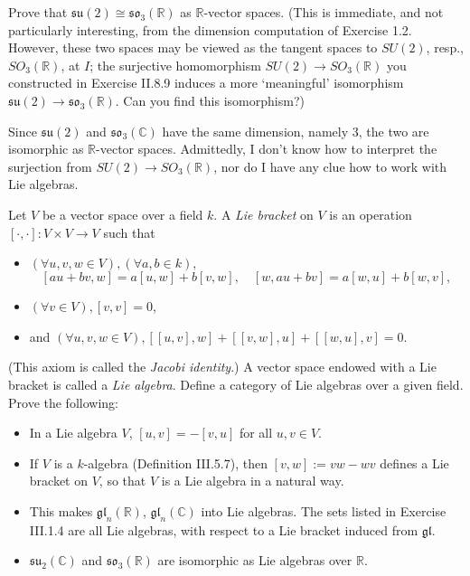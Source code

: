 \documentclass[../../master.tex]{subfiles}
\begin{document}
\begin{problem}
    Prove that $\mathfrak{su}(2) \cong \mathfrak{so}_3(\mathbb{R})$ as $\mathbb{R}$-vector spaces.
    (This is immediate, and not particularly interesting, from the dimension computation of Exercise 1.2.
    However, these two spaces may be viewed as the tangent spaces to $SU(2)$, resp., $SO_3(\mathbb{R})$, at $I$;
    the surjective homomorphism  $SU(2) \to SO_3(\mathbb{R})$ you constructed in Exercise II.8.9 induces a more `meaningful' isomorphism $\mathfrak{su}(2) \to \mathfrak{so}_3(\mathbb{R})$.
    Can you find this isomorphism?)
\end{problem}

\begin{solution}
    Since $\mathfrak{su}(2)$ and $\mathfrak{so}_3(\mathbb{C})$ have the same dimension, namely 3, the two are isomorphic as $\mathbb{R}$-vector spaces.
    Admittedly, I don't know how to interpret the surjection from $SU(2) \to SO_3(\mathbb{R})$, nor do I have any clue how to work with Lie algebras.
\end{solution}

\begin{problem}
    Let $V$ be a vector space over a field $k$.
    A \textit{Lie bracket} on $V$ is an operation $[\cdot, \cdot]: V \times V \to V$ such that
    \begin{itemize}
        \item $(\forall u, v, w \in V), (\forall a, b \in k),$ 
            \[
                [au + bv, w] = a[u, w] + b[v, w], \quad [w, au + bv] = a[w, u] + b[w, v],
            \]
        \item $(\forall v \in V), [v, v] = 0$,
        \item and $(\forall u, v, w \in V), [[u, v], w] + [[v, w], u] + [[w, u], v] = 0$.
    \end{itemize}
    (This axiom is called the \textit{Jacobi identity}.)
    A vector space endowed with a Lie bracket is called a \textit{Lie algebra}.
    Define a category of Lie algebras over a given field.
    Prove the following:
    \begin{itemize}
        \item In a Lie algebra $V$, $[u, v] = -[v, u]$ for all $u, v \in V$.
        \item If $V$ is a $k$-algebra (Definition III.5.7), then $[v, w] := vw - wv$ defines a Lie bracket on $V$, so that $V$ is a Lie algebra in a natural way.
        \item This makes $\mathfrak{gl}_n(\mathbb{R})$, $\mathfrak{gl}_n(\mathbb{C})$ into Lie algebras.
            The sets listed in Exercise III.1.4 are all Lie algebras, with respect to a Lie bracket induced from $\mathfrak{gl}$.
        \item $\mathfrak{su}_2(\mathbb{C})$ and $\mathfrak{so}_3(\mathbb{R})$ are isomorphic as Lie algebras over $\mathbb{R}$.
    \end{itemize}
\end{problem}
\end{document}
